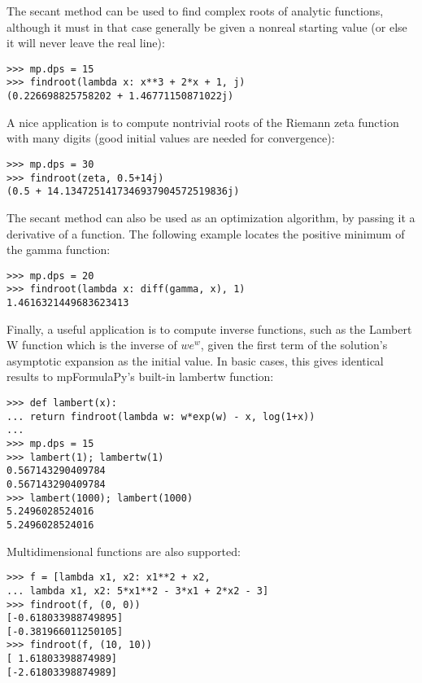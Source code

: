 The secant method can be used to find complex roots of analytic functions, although it must in that case generally be given a nonreal starting value (or else it will never leave the real line):

\begin{lstlisting}
>>> mp.dps = 15
>>> findroot(lambda x: x**3 + 2*x + 1, j)
(0.226698825758202 + 1.46771150871022j)
\end{lstlisting}



A nice application is to compute nontrivial roots of the Riemann zeta function with many digits (good initial values are needed for convergence):

\begin{lstlisting}
>>> mp.dps = 30
>>> findroot(zeta, 0.5+14j)
(0.5 + 14.1347251417346937904572519836j)
\end{lstlisting}


The secant method can also be used as an optimization algorithm, by passing it a derivative of a function. The following example locates the positive minimum of the gamma function:

\begin{lstlisting}
>>> mp.dps = 20
>>> findroot(lambda x: diff(gamma, x), 1)
1.4616321449683623413
\end{lstlisting}

Finally, a useful application is to compute inverse functions, such as the Lambert W function which is the inverse of $w e^w$, given the first term of the solution's asymptotic expansion as the initial value. In basic cases, this gives identical results to mpFormulaPy's built-in lambertw function:

\begin{lstlisting}
>>> def lambert(x):
... return findroot(lambda w: w*exp(w) - x, log(1+x))
...
>>> mp.dps = 15
>>> lambert(1); lambertw(1)
0.567143290409784
0.567143290409784
>>> lambert(1000); lambert(1000)
5.2496028524016
5.2496028524016
\end{lstlisting}

Multidimensional functions are also supported:

\begin{lstlisting}
>>> f = [lambda x1, x2: x1**2 + x2,
... lambda x1, x2: 5*x1**2 - 3*x1 + 2*x2 - 3]
>>> findroot(f, (0, 0))
[-0.618033988749895]
[-0.381966011250105]
>>> findroot(f, (10, 10))
[ 1.61803398874989]
[-2.61803398874989]
\end{lstlisting}

